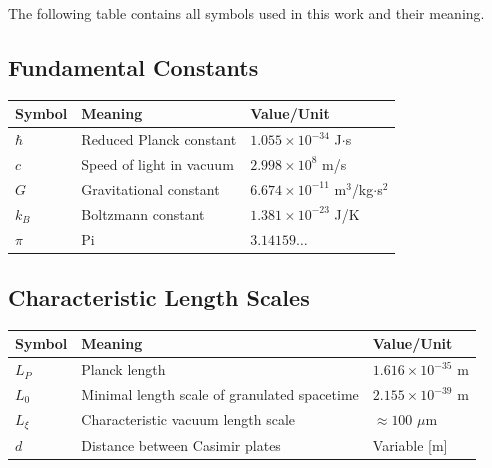 	The following table contains all symbols used in this work and their meaning.
	
	\subsection{Fundamental Constants}
	\begin{longtable}{>{\raggedright\arraybackslash}p{1cm} >{\raggedright\arraybackslash}p{7cm} >{\raggedright\arraybackslash}p{2.5cm}}
		\toprule
		\textbf{Symbol} & \textbf{Meaning} & \textbf{Value/Unit} \\
		\midrule
		$\hbar$ & Reduced Planck constant & $1.055 \times 10^{-34}$ J$\cdot$s \\
		$c$ & Speed of light in vacuum & $2.998 \times 10^8$ m/s \\
		$G$ & Gravitational constant & $6.674 \times 10^{-11}$ m$^3$/kg$\cdot$s$^2$ \\
		$k_B$ & Boltzmann constant & $1.381 \times 10^{-23}$ J/K \\
		$\pi$ & Pi & $3.14159\ldots$ \\
		\bottomrule
	\end{longtable}
	
	\subsection{Characteristic Length Scales}
	\begin{longtable}{>{\raggedright\arraybackslash}p{1.5cm} >{\raggedright\arraybackslash}p{6.5cm} >{\raggedright\arraybackslash}p{2.5cm}}
		\toprule
		\textbf{Symbol} & \textbf{Meaning} & \textbf{Value/Unit} \\
		\midrule
		$L_P$ & Planck length & $1.616 \times 10^{-35}$ m \\
		$L_0$ & Minimal length scale of granulated spacetime & $2.155 \times 10^{-39}$ m \\
		$L_\xi$ & Characteristic vacuum length scale & $\approx 100$ $\mu$m \\
		$d$ & Distance between Casimir plates & Variable [m] \\
		\bottomrule
	\end{longtable}
	
